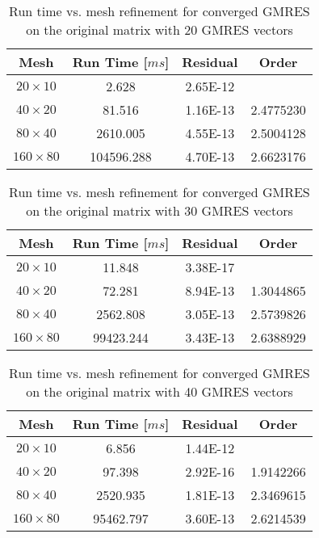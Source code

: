 \documentclass{article}
\begin{document}
\begin{table}[H]
\centering
\caption{Run time vs. mesh refinement for converged GMRES on the original matrix with 20 GMRES vectors}
\label{table_GMRES_4}
\begin{tabular}{cccc}
\hline
Mesh & Run Time [$m s$] & Residual & Order\\
\hline\hline
$20 \times 10$  & 2.628      & 2.65E-12 &           \\
$40 \times 20$  & 81.516     & 1.16E-13 & 2.4775230 \\
$80 \times 40$  & 2610.005   & 4.55E-13 & 2.5004128 \\
$160 \times 80$ & 104596.288 & 4.70E-13 & 2.6623176 \\
\hline
\end{tabular}
\end{table}

\begin{table}[H]
\centering
\caption{Run time vs. mesh refinement for  converged GMRES  on the original matrix with 30 GMRES vectors}
\label{table_GMRES_5}
\begin{tabular}{cccc}
\hline
Mesh & Run Time [$m s$] & Residual & Order\\
\hline\hline
$20 \times 10$  & 11.848    & 3.38E-17 &           \\
$40 \times 20$  & 72.281    & 8.94E-13 & 1.3044865 \\
$80 \times 40$  & 2562.808  & 3.05E-13 & 2.5739826 \\
$160 \times 80$ & 99423.244 & 3.43E-13 & 2.6388929 \\
\hline
\end{tabular}
\end{table}

\begin{table}[H]
\centering
\caption{Run time vs. mesh refinement for  converged GMRES  on the original matrix with 40 GMRES vectors}
\label{table_GMRES_6}
\begin{tabular}{cccc}
\hline
Mesh & Run Time [$m s$] & Residual & Order\\
\hline\hline
$20 \times 10$  & 6.856     & 1.44E-12 &           \\
$40 \times 20$  & 97.398    & 2.92E-16 & 1.9142266 \\
$80 \times 40$  & 2520.935  & 1.81E-13 & 2.3469615 \\
$160 \times 80$ & 95462.797 & 3.60E-13 & 2.6214539 \\
\hline
\end{tabular}
\end{table}
\end{document}
